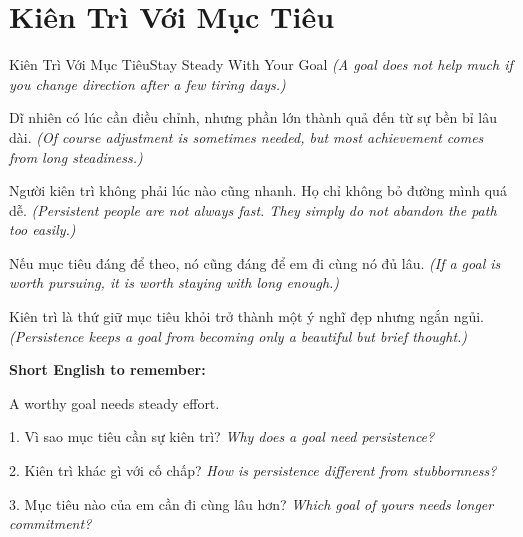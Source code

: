 \section{Kiên Trì Với Mục Tiêu}
\begin{truyen}{Kiên Trì Với Mục Tiêu}{Stay Steady With Your Goal}
\textit{(A goal does not help much if you change direction after a few tiring days.)}

Dĩ nhiên có lúc cần điều chỉnh, nhưng phần lớn thành quả đến từ sự bền bỉ lâu dài.
\textit{(Of course adjustment is sometimes needed, but most achievement comes from long steadiness.)}

Người kiên trì không phải lúc nào cũng nhanh. Họ chỉ không bỏ đường mình quá dễ.
\textit{(Persistent people are not always fast. They simply do not abandon the path too easily.)}

Nếu mục tiêu đáng để theo, nó cũng đáng để em đi cùng nó đủ lâu.
\textit{(If a goal is worth pursuing, it is worth staying with long enough.)}
\end{truyen}

\begin{baihoc}
Kiên trì là thứ giữ mục tiêu khỏi trở thành một ý nghĩ đẹp nhưng ngắn ngủi.
\textit{(Persistence keeps a goal from becoming only a beautiful but brief thought.)}
\end{baihoc}

\begin{ghinhoanh}
\textbf{Short English to remember:}

A worthy goal needs steady effort.

\end{ghinhoanh}

\begin{tuhocnhanh}
1. Vì sao mục tiêu cần sự kiên trì? \textit{Why does a goal need persistence?}

2. Kiên trì khác gì với cố chấp? \textit{How is persistence different from stubbornness?}

3. Mục tiêu nào của em cần đi cùng lâu hơn? \textit{Which goal of yours needs longer commitment?}
\end{tuhocnhanh}
\ngancach

